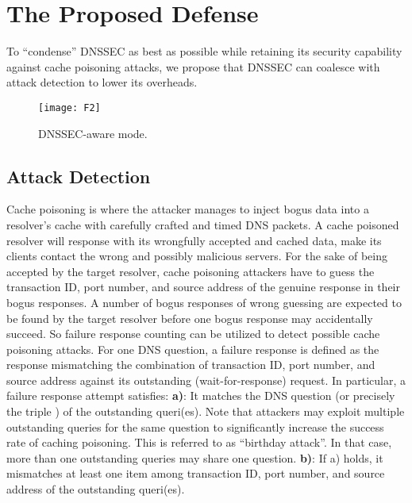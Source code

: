 \documentclass[conference]{IEEEtran}
\begin{document}
\section{The Proposed Defense}

To ``condense'' DNSSEC as best as possible while retaining its security capability against cache poisoning attacks, we propose that DNSSEC can coalesce with attack detection to lower its overheads.

\begin{figure}[!t]
\centering
\texttt{[image: F2]}
\caption{DNSSEC-aware mode.}
\vspace{-2em}
\end{figure}

\subsection{Attack Detection}

Cache poisoning is where the attacker manages to inject bogus data into a resolver's cache with carefully crafted and timed DNS packets. A cache poisoned resolver will response with its wrongfully accepted and cached data, make its clients contact the wrong and possibly malicious servers. For the sake of being accepted by the target resolver, cache poisoning attackers have to guess the transaction ID, port number, and source address of the genuine response in their bogus responses. A number of bogus responses of wrong guessing are expected to be found by the target resolver before one bogus response may accidentally succeed. So failure response counting can be utilized to detect possible cache poisoning attacks. For one DNS question, a failure response is defined as the response mismatching the combination of transaction ID, port number, and source address against its outstanding (wait-for-response) request. In particular, a failure response attempt satisfies: \textbf{a)}: It matches the DNS question (or precisely the triple ) of the outstanding queri(es). Note that attackers may exploit multiple outstanding queries for the same question to significantly increase the success rate of caching poisoning. This is referred to as ``birthday attack''. In that case, more than one outstanding queries may share one question. \textbf{b)}: If a) holds, it mismatches at least one item among transaction ID, port number, and source address of the outstanding queri(es).
\end{document}
